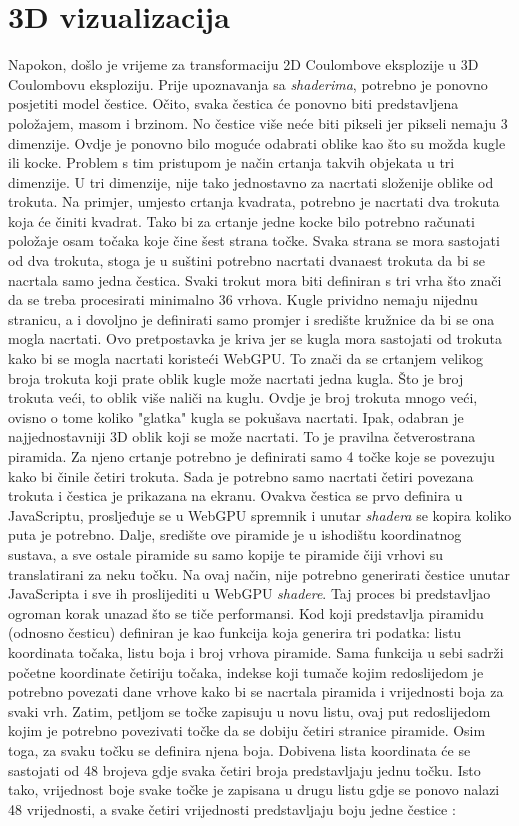\documentclass{foi}
\begin{document}
\chapter{3D vizualizacija} 
Napokon, došlo je vrijeme za transformaciju 2D Coulombove eksplozije u 3D Coulombovu eksploziju. Prije upoznavanja sa \textit{shaderima}, potrebno je ponovno posjetiti model čestice. Očito, svaka čestica će ponovno biti predstavljena položajem, masom i brzinom. No čestice više neće biti pikseli jer pikseli nemaju 3 dimenzije. Ovdje je ponovno bilo moguće odabrati oblike kao što su možda kugle ili kocke. Problem s tim pristupom je način crtanja takvih objekata u tri dimenzije. U tri dimenzije, nije tako jednostavno za nacrtati složenije oblike od trokuta. Na primjer, umjesto crtanja kvadrata, potrebno je nacrtati dva trokuta koja će činiti kvadrat. Tako bi za crtanje jedne kocke bilo potrebno računati položaje osam točaka koje čine šest strana točke. Svaka strana se mora sastojati od dva trokuta, stoga je u suštini potrebno nacrtati dvanaest trokuta da bi se nacrtala samo jedna čestica. Svaki trokut mora biti definiran s tri vrha što znači da se treba procesirati minimalno 36 vrhova. Kugle prividno nemaju nijednu stranicu, a i dovoljno je definirati samo promjer i središte kružnice da bi se ona mogla nacrtati. Ovo pretpostavka je kriva jer se kugla mora sastojati od trokuta kako bi se mogla nacrtati koristeći WebGPU. To znači da se crtanjem velikog broja trokuta koji prate oblik kugle može nacrtati jedna kugla. Što je broj trokuta veći, to oblik više naliči na kuglu. Ovdje je broj trokuta mnogo veći, ovisno o tome koliko "glatka" kugla se pokušava nacrtati. Ipak, odabran je najjednostavniji 3D oblik koji se može nacrtati. To je pravilna četverostrana piramida. Za njeno crtanje potrebno je definirati samo 4 točke koje se povezuju kako bi činile četiri trokuta. Sada je potrebno samo nacrtati četiri povezana trokuta i čestica je prikazana na ekranu. Ovakva čestica se prvo definira u JavaScriptu, prosljeđuje se u WebGPU spremnik i unutar \textit{shadera} se kopira koliko puta je potrebno. Dalje, središte ove piramide je u ishodištu koordinatnog sustava, a sve ostale piramide su samo kopije te piramide čiji vrhovi su translatirani za neku točku. Na ovaj način, nije potrebno generirati čestice unutar JavaScripta i sve ih proslijediti u WebGPU \textit{shadere}. Taj proces bi predstavljao ogroman korak unazad što se tiče performansi. Kod koji predstavlja piramidu (odnosno česticu) definiran je kao funkcija koja generira tri podatka: listu koordinata točaka, listu boja i broj vrhova piramide. Sama funkcija u sebi sadrži početne koordinate četiriju točaka, indekse koji tumače kojim redoslijedom je potrebno povezati dane vrhove kako bi se nacrtala piramida i vrijednosti boja za svaki vrh. Zatim, petljom se točke zapisuju u novu listu, ovaj put redoslijedom kojim je potrebno povezivati točke da se dobiju četiri stranice piramide. Osim toga, za svaku točku se definira njena boja. Dobivena lista koordinata će se sastojati od 48 brojeva gdje svaka četiri broja predstavljaju jednu točku. Isto tako, vrijednost boje svake točke je zapisana u drugu listu gdje se ponovo nalazi 48 vrijednosti, a svake četiri vrijednosti predstavljaju boju jedne čestice \parencite{WebGPUFundamentalsCameras}:
\end{document}
